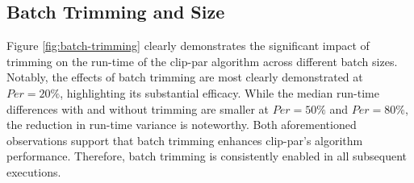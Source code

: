 \documentclass{egpubl}
\begin{document}
\subsection{Batch Trimming and Size}
\label{sec:batch-size-and-trimming}

Figure \ref{fig:batch-trimming} clearly demonstrates the significant impact of trimming on the run-time of the clip-par algorithm across different batch sizes. Notably, the effects of batch trimming are most clearly demonstrated at $Per = 20\%$, highlighting its substantial efficacy. While the median run-time differences with and without trimming are smaller at $Per = 50\%$ and $Per = 80\%$, the reduction in run-time variance is noteworthy. Both aforementioned observations support that batch trimming enhances clip-par's algorithm performance. Therefore, batch trimming is consistently enabled in all subsequent executions.
\end{document}

